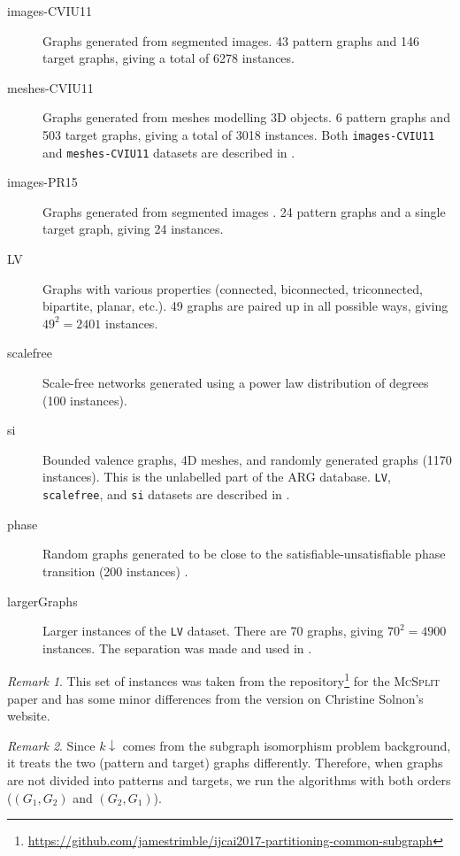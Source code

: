 \documentclass{l4proj}
\theoremstyle{definition}
\theoremstyle{remark}
\newtheorem{remark}{Remark}[chapter]
\begin{document}
\begin{description}
\item[images-CVIU11] Graphs generated from segmented images. 43 pattern graphs
  and 146 target graphs, giving a total of \num{6278} instances.
\item[meshes-CVIU11] Graphs generated from meshes modelling 3D
  objects. 6 pattern graphs and 503 target graphs, giving a total of \num{3018}
  instances. Both \texttt{images-CVIU11} and \texttt{meshes-CVIU11} datasets are
  described in \cite{DBLP:journals/cviu/DamiandSHJS11}.
\item[images-PR15] Graphs generated from segmented images
  \cite{DBLP:journals/pr/SolnonDHJ15}. 24 pattern graphs and a single target
  graph, giving 24 instances.
\item[LV] Graphs with various properties (connected, biconnected, triconnected,
  bipartite, planar, etc.). 49 graphs are paired up in all possible ways, giving
  $49^2=\num{2401}$ instances.
\item[scalefree] Scale-free networks generated using a power law distribution of
  degrees (100 instances).
\item[si] Bounded valence graphs, 4D meshes, and randomly generated graphs
  (\num{1170} instances). This is the unlabelled part of the ARG database.
  \texttt{LV}, \texttt{scalefree}, and \texttt{si} datasets are described in
  \cite{DBLP:journals/ai/Solnon10, DBLP:journals/constraints/ZampelliDS10}.
\item[phase] Random graphs generated to be close to the
  satisfiable-unsatisfiable phase transition (200 instances)
  \cite{DBLP:conf/ijcai/McCreeshPT16}.
\item[largerGraphs] Larger instances of the \texttt{LV} dataset. There are 70
  graphs, giving $70^2=\num{4900}$ instances. The separation was made and used
  in \cite{DBLP:conf/aaai/HoffmannMR17, DBLP:conf/lion/KotthoffMS16,
    DBLP:conf/ijcai/McCreeshPT17}.
\end{description}

\begin{remark}
This set of instances was taken from the
repository\footnote{\url{https://github.com/jamestrimble/ijcai2017-partitioning-common-subgraph}}
for the \textsc{McSplit} paper \cite{DBLP:conf/ijcai/McCreeshPT17} and has some
minor differences from the version on Christine Solnon's website.
\end{remark}

\begin{remark}
  Since $k\downarrow$ comes from the subgraph isomorphism problem background, it
  treats the two (pattern and target) graphs differently. Therefore, when graphs
  are not divided into patterns and targets, we run the algorithms with both
  orders ($(G_1, G_2)$ and $(G_2, G_1)$).
\end{remark}
\end{document}
